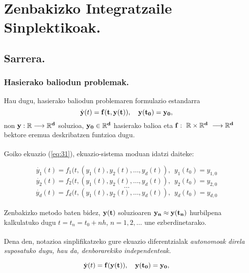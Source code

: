\section{Zenbakizko Integratzaile Sinplektikoak.}

\subsection{Sarrera.}

\subsubsection{Hasierako baliodun problemak.}

Hau dugu, hasierako baliodun problemaren formulazio estandarra 
\begin{equation}
\label{eq:31}
\dot{\bf{y}}(t)=\bf{f}(t,\bf{y}(t)),\ \ \ \bf{y}(t_0)=\bf{y_0},
\end{equation}
non $\bf{y}: \mathbb{R} \longrightarrow {\mathbb{R}}^d$ soluzioa, $\bf{y_0} \in \mathbb{R}^d$ hasierako balioa eta $\bf{f}: \ \mathbb{R} \times {\mathbb{R}}^d \ \longrightarrow {\mathbb{R}}^d$ bektore eremua deskribatzen funtzioa dugu.

\paragraph*{}Goiko ekuazio (\ref{eq:31}), ekuazio-sistema moduan idatzi daiteke:

\[\dot{y_1}(t)=f_1(t,(y_1(t),y_2(t),\dots,y_d(t)), \ \ y_1(t_0)=y_{1,0}\]
\[\dot{y_2}(t)=f_2(t,(y_1(t),y_2(t),\dots,y_d(t)), \ \ y_2(t_0)=y_{2,0}\]
\[\dots\]
\[\dot{y_d}(t)=f_d(t,(y_1(t),y_2(t),\dots,y_d(t)),  \ \ y_d(t_0)=y_{d,0}\]


\paragraph*{}Zenbakizko metodo baten bidez, $\bf{y}(t)$ soluzioaren $\bf{y_n} \approx \bf{y}(t_n)$ hurbilpena kalkulatuko dugu $t=t_n=t_0+nh$, $n=1,2,\dots$ une ezberdinetarako.

\paragraph*{}Dena den, notazioa sinplifikatzeko gure ekuazio diferentzialak \it{autonomoak} direla suposatuko dugu, hau da, denborarekiko independenteak.

\begin{equation}
\dot{\bf{y}}(t)=\bf{f}(\bf{y}(t)),\ \ \ \bf{y}(t_0)=\bf{y_0},
\end{equation}

